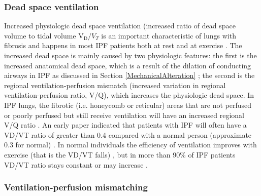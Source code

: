 \subsubsection{Dead space ventilation}
Increased physiologic dead space ventilation (increased ratio of dead space volume to tidal volume $\mathrm{V_D}/V_T$ is an important characteristic of lungs with fibrosis and happens in most IPF patients both at rest and at exercise \citep{fulmer1976diffuse, crystal1976idiopathic, agusti1991mechanisms, miki2009acidosis}. The increased dead space is mainly caused by two physiologic features: the first is the increased anatomical dead space, which is a result of the dilation of conducting airways in IPF as discussed in Section \ref{MechanicalAlteration} \citep{plantier2016increased}; the second is the regional ventilation-perfusion mismatch (increased variation in regional ventilation-perfusion ratio, V/Q), which increases the physiologic dead space. In IPF lungs, the fibrotic (i.e. honeycomb or reticular) areas that are  not perfused or poorly perfused but still receive ventilation will have an increased regional V/Q ratio \citep{strickland1993cause, plantier2018physiology}. An early paper indicated that patients with IPF will often have a VD/VT ratio of greater than 0.4 compared with a normal person (approximate 0.3 for normal) \citep{crystal1976idiopathic}. In normal individuals the efficiency of ventilation improves with exercise (that is the VD/VT falls) \citep{ jones1966physiological, wasserman1975exercise}, but in more than 90\% of IPF patients VD/VT ratio stays constant or may increase \citep{crystal1976idiopathic}. 

\subsubsection{Ventilation-perfusion mismatching}

